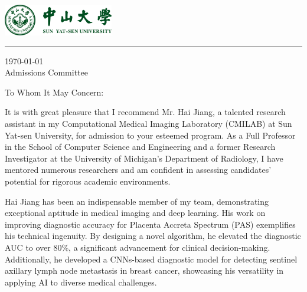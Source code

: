 \documentclass{article}
\begin{document}
\includegraphics[width=0.36\textwidth]{sysu.pdf}

\vspace{-1.5em} %
\begin{FlushLeft}
\rule{\linewidth}{1pt} %
\end{FlushLeft}



\begin{FlushLeft}
\today \bigskip\\ %
Admissions Committee
\end{FlushLeft}
\vspace{-3em}


\bigskip %
\vspace{15pt}


To Whom It May Concern: 

It is with great pleasure that I recommend Mr. Hai Jiang, 
a talented research assistant in my Computational Medical Imaging Laboratory (CMILAB) at Sun Yat-sen University, 
for admission to your esteemed program. 
As a Full Professor in the School of Computer Science and Engineering and 
a former Research Investigator at the University of Michigan's Department of Radiology, 
I have mentored numerous researchers and am confident in assessing candidates' potential for rigorous academic environments.

Hai Jiang has been an indispensable member of my team, demonstrating exceptional aptitude in medical imaging and deep learning. 
His work on improving diagnostic accuracy for Placenta Accreta Spectrum (PAS) exemplifies his technical ingenuity. 
By designing a novel algorithm, he elevated the diagnostic AUC to over 80\%, a significant advancement for clinical decision-making. 
Additionally, he developed a CNNs-based diagnostic model for detecting sentinel axillary lymph node metastasis in breast cancer, showcasing his versatility in applying AI to diverse medical challenges.
\end{document}

